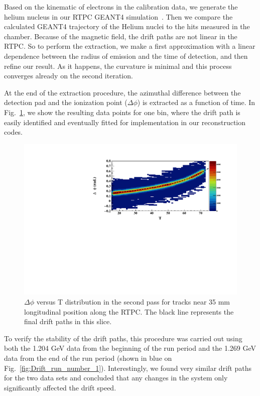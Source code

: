 \documentclass[preprint,5p]{elsarticle}
\begin{document}
Based on the kinematic of electrons in the calibration data, 
we generate the helium nucleus in our RTPC GEANT4 simulation~\cite{GEANT4}. Then 
we compare the calculated GEANT4 trajectory of the Helium nuclei to 
the hits measured in the chamber. 
Because of the magnetic field, the drift paths are not linear in the RTPC. So 
to perform the extraction, we make a first approximation with a linear 
dependence between the radius of emission and the time of detection, and then 
refine our result. As it happens, the curvature is minimal and this process 
converges already on the second iteration. 

At the end of the extraction procedure, the azimuthal difference between the detection pad and 
the ionization point ($\Delta\phi$) is extracted as a function of time. 
In Fig.~\ref{fig:DELTA_PHI_TDC}, we show the resulting data points for one 
bin, where the drift path is easily identified and eventually fitted for 
implementation in our reconstruction codes.

\begin{figure}[tb]
\centering
\includegraphics[scale=0.42]{fig_2017/FitResult_p2_11.pdf}
\caption{$\Delta \phi$ versus T distribution in the second pass for tracks
near 35 mm longitudinal position along the RTPC. The black line represents 
the final drift paths in this slice.}
\label{fig:DELTA_PHI_TDC}
\end{figure}

To verify the stability of the drift paths, this procedure was carried out 
using both the 1.204 GeV data from the beginning of the run period and the 
1.269 GeV data from the end of the run period (shown in blue on 
Fig.~\ref{fig:Drift_run_number_1}). Interestingly, we found very similar drift paths
for the two data sets and concluded that any changes in the system only
significantly affected the drift speed.
\end{document}
